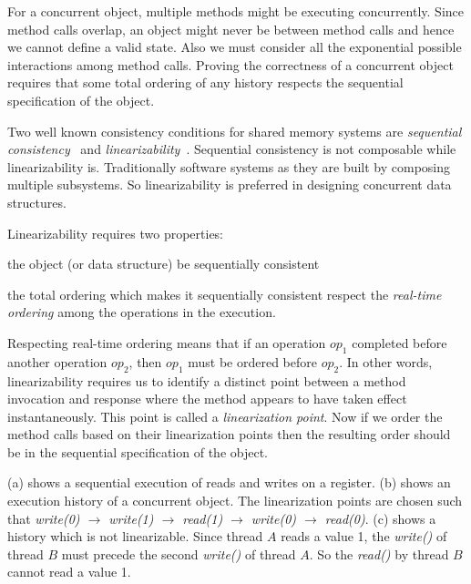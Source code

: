 For a concurrent object, multiple methods might be executing concurrently. Since method calls overlap, an object might never be between method calls and hence we cannot define a valid state. Also we must consider all the exponential possible interactions among method calls. Proving the correctness of  a concurrent object requires that some total ordering of any history respects the sequential specification of the object.

Two well known consistency conditions for shared memory systems are \emph{sequential consistency}~\cite{Lamport:1979} and \emph{linearizability}~\cite{HerWin:1990:TOPLAS}. Sequential consistency is not composable while linearizability is. Traditionally software systems as they are built by composing multiple subsystems. So linearizability is preferred in designing concurrent data structures.

Linearizability requires two properties:
\begin{enumerate*}[label=(\roman*)]
\item the object (or data structure) be sequentially consistent
\item the total ordering which makes it sequentially consistent respect the \emph{real-time ordering} among the operations in the execution.
\end{enumerate*}
Respecting real-time ordering means that if an operation $op_1$ completed before another operation $op_2$, then $op_1$ must be ordered before $op_2$. In other words, linearizability  requires us to identify a distinct point between a method invocation and response where the method appears to have taken effect instantaneously. This point is called a \emph{linearization point}. Now if we order the method calls based on their linearization points then the resulting order should be in the sequential specification of the object.



(a) shows a sequential execution of reads and writes on a register. (b) shows an execution history of a concurrent object. The linearization points are chosen such that \textit{write(0) $\rightarrow$ write(1) $\rightarrow$ read(1) $\rightarrow$ write(0) $\rightarrow$ read(0)}. (c) shows a history which is not linearizable. Since thread $A$ reads a value 1, the \textit{write()} of thread $B$ must precede the second \textit{write()} of thread $A$. So the \textit{read()} by thread $B$ cannot read a value 1.

